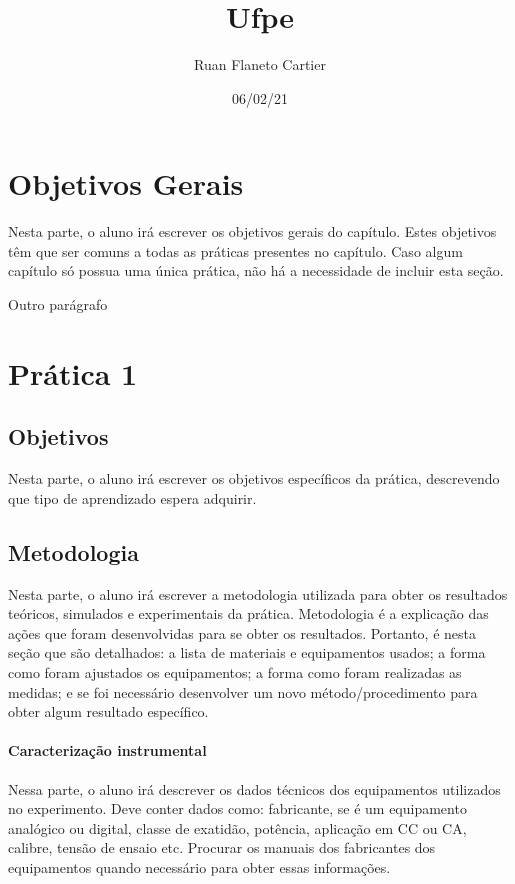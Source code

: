 \documentclass[12pt]{article}
\author{Ruan Flaneto Cartier}
\date{06/02/21}
\title{Ufpe}
\begin{document}
\maketitle



\section{Objetivos Gerais}
\label{sec:org558cdd5}

Nesta parte, o aluno irá escrever os objetivos gerais do capítulo. Estes objetivos têm que ser comuns a todas as práticas presentes no capítulo. Caso algum capítulo só possua uma única prática, não há a necessidade de incluir esta seção.

Outro parágrafo
\section{Prática 1}
\label{sec:org5ed5a9e}
\subsection{Objetivos}
\label{sec:org771cd7b}

Nesta parte, o aluno irá escrever os objetivos específicos da prática, descrevendo que tipo de aprendizado espera adquirir.

\subsection{Metodologia}
\label{sec:org4798ae8}
Nesta parte, o aluno irá escrever a metodologia utilizada para obter os resultados teóricos, simulados e experimentais da prática. Metodologia é a explicação das ações que foram desenvolvidas para se obter os resultados. Portanto, é nesta seção que são detalhados: a lista de materiais e equipamentos usados; a forma como foram ajustados os equipamentos; a forma como foram realizadas as medidas; e se foi necessário desenvolver um novo método/procedimento para obter algum resultado específico.

\paragraph{Caracterização instrumental}
Nessa parte, o aluno irá descrever os dados técnicos dos equipamentos utilizados no experimento. Deve conter dados como: fabricante, se é um equipamento analógico ou digital, classe de exatidão, potência, aplicação em CC ou CA, calibre, tensão de ensaio etc. Procurar os manuais dos fabricantes dos equipamentos quando necessário para obter essas informações.
\end{document}
